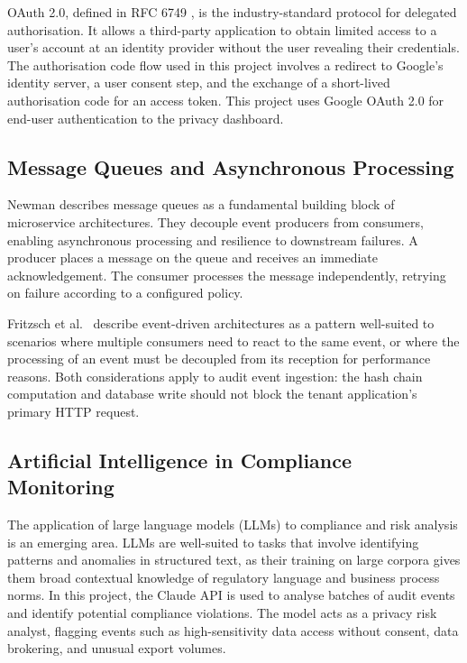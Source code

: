 \documentclass[a4paper,12pt,onecolumn]{report}
\begin{document}
OAuth 2.0, defined in RFC 6749 \cite{rfc6749}, is the industry-standard protocol for delegated authorisation.
It allows a third-party application to obtain limited access to a user's account at an identity provider without the user revealing their credentials.
The authorisation code flow used in this project involves a redirect to Google's identity server, a user consent step, and the exchange of a short-lived authorisation code for an access token.
This project uses Google OAuth 2.0 for end-user authentication to the privacy dashboard.

\subsection{Message Queues and Asynchronous Processing}

Newman \cite{microservices} describes message queues as a fundamental building block of microservice architectures.
They decouple event producers from consumers, enabling asynchronous processing and resilience to downstream failures.
A producer places a message on the queue and receives an immediate acknowledgement.
The consumer processes the message independently, retrying on failure according to a configured policy.

Fritzsch et al.\ \cite{eventdriven} describe event-driven architectures as a pattern well-suited to scenarios where multiple consumers need to react to the same event, or where the processing of an event must be decoupled from its reception for performance reasons.
Both considerations apply to audit event ingestion: the hash chain computation and database write should not block the tenant application's primary HTTP request.

\subsection{Artificial Intelligence in Compliance Monitoring}

The application of large language models (LLMs) to compliance and risk analysis is an emerging area.
LLMs are well-suited to tasks that involve identifying patterns and anomalies in structured text, as their training on large corpora gives them broad contextual knowledge of regulatory language and business process norms.
In this project, the Claude API is used to analyse batches of audit events and identify potential compliance violations.
The model acts as a privacy risk analyst, flagging events such as high-sensitivity data access without consent, data brokering, and unusual export volumes.
\end{document}
